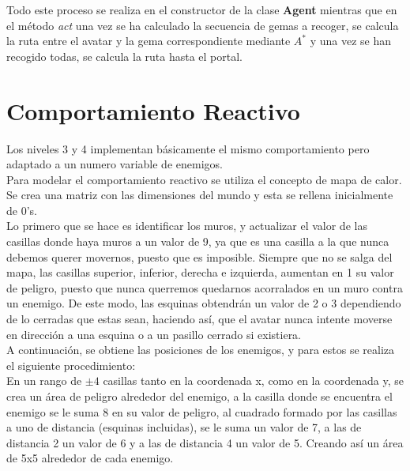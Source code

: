 Todo este proceso se realiza en el constructor de la clase \textbf{Agent} mientras que en el método \emph{act} una vez se ha calculado la secuencia de gemas a recoger, se calcula la ruta entre el avatar y la gema correspondiente mediante $ A^{*} $ y una vez se han recogido todas, se calcula la ruta hasta el portal.


\newpage
\chapter{Comportamiento Reactivo}
Los niveles 3 y 4 implementan básicamente el mismo comportamiento pero adaptado a un numero variable de enemigos.\\

Para modelar el comportamiento reactivo se utiliza el concepto de mapa de calor.\\
Se crea una matriz con las dimensiones del mundo y esta se rellena inicialmente de 0's.\\
Lo primero que se hace es identificar los muros, y actualizar el valor de las casillas donde haya muros a un valor de 9, ya que es una casilla a la que nunca debemos querer movernos, puesto que es imposible. Siempre que no se salga del mapa, las casillas superior, inferior, derecha e izquierda, aumentan en 1 su valor de peligro, puesto que nunca querremos quedarnos acorralados en un muro contra un enemigo. De este modo, las esquinas obtendrán un valor de 2 o 3 dependiendo de lo cerradas que estas sean, haciendo así, que el avatar nunca intente moverse en dirección a una esquina o a un pasillo cerrado si existiera.\\
A continuación, se obtiene las posiciones de los enemigos, y para estos se realiza el siguiente procedimiento: \\
En un rango de $\pm 4$ casillas tanto en la coordenada x, como en la coordenada y, se crea un área de peligro alrededor del enemigo, a la casilla donde se encuentra el enemigo se le suma 8 en su valor de peligro, al cuadrado formado por las casillas a uno de distancia (esquinas incluidas), se le suma un valor de 7, a las de distancia 2 un valor de 6 y a las de distancia 4 un valor de 5. Creando así un área de 5x5 alrededor de cada enemigo.\\

